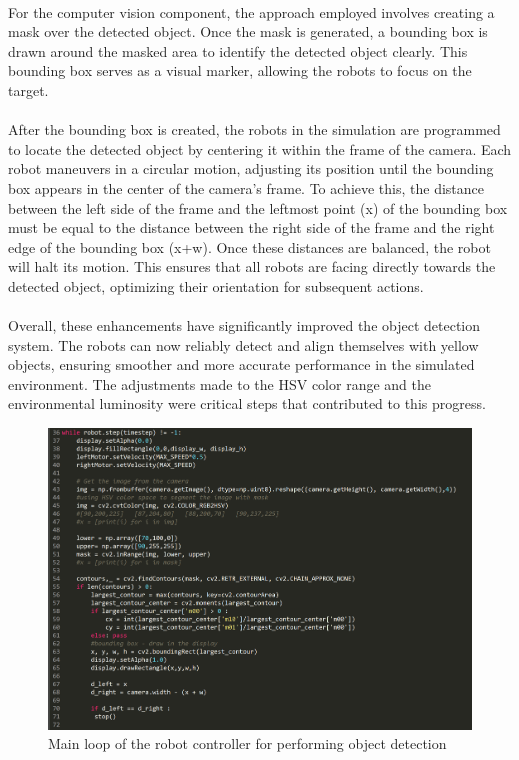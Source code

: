 \paragraph*{}
For the computer vision component, the approach employed involves creating a mask over the detected object. Once the mask is generated, a bounding box is drawn around the masked area to identify the detected object clearly. This bounding box serves as a visual marker, allowing the robots to focus on the target.


\paragraph*{}
After the bounding box is created, the robots in the simulation are programmed to locate the detected object by centering it within the frame of the camera. Each robot maneuvers in a circular motion, adjusting its position until the bounding box appears in the center of the camera's frame. To achieve this, the distance between the left side of the frame and the leftmost point (x) of the bounding box must be equal to the distance between the right side of the frame and the right edge of the bounding box (x+w). Once these distances are balanced, the robot will halt its motion. This ensures that all robots are facing directly towards the detected object, optimizing their orientation for subsequent actions.

\paragraph*{}
Overall, these enhancements have significantly improved the object detection system. The robots can now reliably detect and align themselves with yellow objects, ensuring smoother and more accurate performance in the simulated environment. The adjustments made to the HSV color range and the environmental luminosity were critical steps that contributed to this progress.

\begin{figure}[H]
    \centering
    \includegraphics[width=0.6\linewidth]{assets/images/object_detection/figure1.png}
    \caption{Main loop of the robot controller for performing object detection}
    \label{fig:object detection figure 1.} 
\end{figure}

